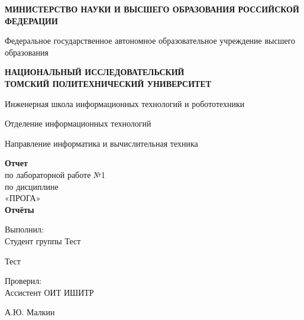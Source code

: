 \documentclass[a4paper,12pt]{article}
\title{}
\author{}
\date{}
\begin{document}
\begin{center}
    \textbf{МИНИСТЕРСТВО НАУКИ И ВЫСШЕГО ОБРАЗОВАНИЯ РОССИЙСКОЙ ФЕДЕРАЦИИ}

    \vspace{0.1cm}

    Федеральное государственное автономное образовательное учреждение высшего образования

    \vspace{0.1cm}

    \textbf{НАЦИОНАЛЬНЫЙ ИССЛЕДОВАТЕЛЬСКИЙ \\ТОМСКИЙ ПОЛИТЕХНИЧЕСКИЙ УНИВЕРСИТЕТ}

    \vspace{1.0cm}

    Инженерная школа информационных технологий и робототехники

    Отделение информационных технологий

    Направление информатика и вычислительная техника

    \vspace{2cm}

    \textbf{Отчет} \\
    по лабораторной работе №1 \\
    \vspace{0.5cm}
    по дисциплине \\
    «\MakeUppercase{Прога}» \\
    \vspace{0.5cm}
    \textbf{Отчёты}
\end{center}

\vspace{1.5cm}

\begin{flushleft}
    Выполнил: \\
    Студент группы Тест
\end{flushleft}
\begin{center}
    \underline{\hspace{5cm}}
\end{center}
\begin{flushright}
    Тест
\end{flushright}

\vspace{0.5cm}

\begin{flushleft}
    Проверил: \\
    Ассистент ОИТ ИШИТР
\end{flushleft}
\begin{center}
    \underline{\hspace{5cm}}
\end{center}
\begin{flushright}
    А.Ю. Малкин
\end{flushright}
\end{document}
